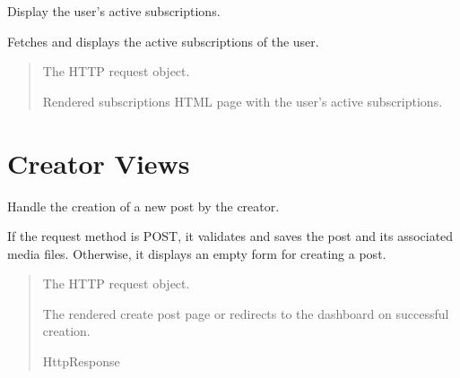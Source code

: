 \documentclass[letterpaper,10pt,english]{sphinxmanual}
\begin{document}
\begin{fulllineitems}
\label{\detokenize{modules/views:client.views.subscriptions}}
\pysigstartsignatures
{}
\pysigstopsignatures
\sphinxAtStartPar
Display the user’s active subscriptions.

\sphinxAtStartPar
Fetches and displays the active subscriptions of the user.
\begin{quote}\begin{description}
\sphinxAtStartPar
{} \textendash{} The HTTP request object.

\sphinxAtStartPar
Rendered subscriptions HTML page with the user’s active subscriptions.

\end{description}\end{quote}

\end{fulllineitems}



\section{Creator Views}
\label{\detokenize{modules/views:module-creator.views}}\label{\detokenize{modules/views:creator-views}}

\begin{fulllineitems}
\label{\detokenize{modules/views:creator.views.create_post}}
\pysigstartsignatures
{}
\pysigstopsignatures
\sphinxAtStartPar
Handle the creation of a new post by the creator.

\sphinxAtStartPar
If the request method is POST, it validates and saves the post and its associated media files.
Otherwise, it displays an empty form for creating a post.
\begin{quote}\begin{description}
\sphinxAtStartPar
{} \textendash{} The HTTP request object.

\sphinxAtStartPar
The rendered create post page or redirects to the dashboard on successful creation.

\sphinxAtStartPar
HttpResponse

\end{description}\end{quote}

\end{fulllineitems}
\end{document}
